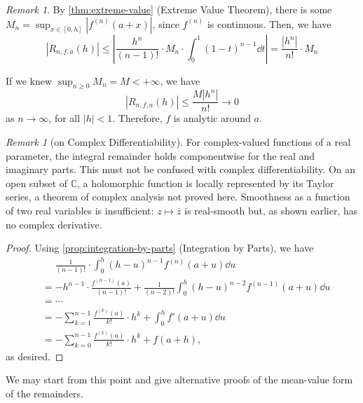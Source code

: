 \documentclass[11pt]{article}
\numberwithin{equation}{section}
\theoremstyle{definition}
\theoremstyle{remark}
\newtheorem{remark}[theorem]{Remark}
\newcommand{\pqty}[1]{\left(#1\right)}
\newcommand{\abs}[1]{\left|#1\right|}
\newcommand{\ccintv}[2]{[#1,#2]}
\newcommand{\plusinfty}{+\infty}
\begin{document}
\begin{remark}\label{analysis-unit-0174}
    By \autoref{thm:extreme-value} (Extreme Value Theorem), there is some \(M_n = \sup_{x \in \ccintv{0}{h}} \abs{f^{\pqty{n}} \pqty{a + x}}\), since \(f^{\pqty{n}}\) is continuous. Then, we have
    \[
        \abs{R_{n, f, a} \pqty{h}} \leq \abs{\frac{h^n}{\pqty{n - 1}!} \cdot M_n \cdot \int_{0}^{1} \pqty{1 - t}^{n - 1} \dd{t}} = \frac{\abs{h^n}}{n!} \cdot M_n
    \]

    If we knew \(\sup_{n \geq 0} M_n = M < \plusinfty\), we have
    \[
        \abs{R_{n, f, a} \pqty{h}} \leq \frac{M \abs{h^n}}{n!} \to 0
    \]
    as \(n \to \infty\), for all \(\abs{h} < 1\). Therefore, \(f\) is analytic around \(a\).
\end{remark}

\begin{remark}[on Complex Differentiability]\label{analysis-unit-0175}
    For complex-valued functions of a real parameter, the integral remainder
holds componentwise for the real and imaginary parts. This must not be confused
with complex differentiability. On an open subset of \(\mathbb C\), a holomorphic
function is locally represented by its Taylor series, a theorem of complex
analysis not proved here. Smoothness as a function of two real variables is
insufficient: \(z\mapsto\overline z\) is real-smooth but, as shown earlier,
has no complex derivative.
\end{remark}

\begin{proof}
    Using \autoref{prop:integration-by-parts} (Integration by Parts), we have
    \begin{align*}
        &\phantom{=} \frac{1}{\pqty{n - 1}!} \cdot \int_{0}^{h} \pqty{h - u}^{n - 1} f^{\pqty{n}} \pqty{a + u} \dd{u} \\
        &= - h^{n - 1} \cdot \frac{f^{\pqty{n - 1}} \pqty{a}}{\pqty{n - 1}!} + \frac{1}{\pqty{n - 2}!} \int_{0}^{h} \pqty{h - u}^{n - 2} f^{\pqty{n - 1}} \pqty{a + u} \dd{u} \\
        &= \cdots \\
        &= - \sum_{k = 1}^{n - 1} \frac{f^{\pqty{k}} \pqty{a}}{k!} \cdot h^k + \int_{0}^{h} f'\pqty{a + u} \dd{u} \\
        &= - \sum_{k = 0}^{n - 1} \frac{f^{\pqty{k}} \pqty{a}}{k!} \cdot h^k + f\pqty{a + h},
    \end{align*}
    as desired.
\end{proof}

We may start from this point and give alternative proofs of the mean-value form of the remainders.
\end{document}
